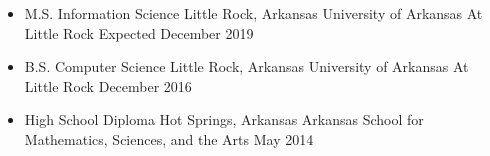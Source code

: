 \begin{itemize}

\item
	\ressubheading
		{M.S. Information Science}
		{Little Rock, Arkansas}
		{University of Arkansas At Little Rock}
		{Expected December 2019}
	
\item
	\ressubheading
		{B.S. Computer Science}
		{Little Rock, Arkansas}
		{University of Arkansas At Little Rock}
		{December 2016}

\item
	\ressubheading
		{High School Diploma}
		{Hot Springs, Arkansas}
		{Arkansas School for Mathematics, Sciences, and the Arts}
		{May 2014}
\end{itemize}
